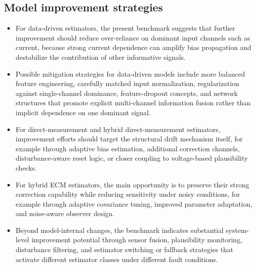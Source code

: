 \documentclass[review]{elsarticle}
\begin{document}
\subsection{Model improvement strategies}
\begin{itemize}[leftmargin=*]
    \item For data-driven estimators, the present benchmark suggests that further improvement should reduce over-reliance on dominant input channels such as current, because strong current dependence can amplify bias propagation and destabilize the contribution of other informative signals.
    \item Possible mitigation strategies for data-driven models include more balanced feature engineering, carefully matched input normalization, regularization against single-channel dominance, feature-dropout concepts, and network structures that promote explicit multi-channel information fusion rather than implicit dependence on one dominant signal.
    \item For direct-measurement and hybrid direct-measurement estimators, improvement efforts should target the structural drift mechanism itself, for example through adaptive bias estimation, additional correction channels, disturbance-aware reset logic, or closer coupling to voltage-based plausibility checks.
    \item For hybrid ECM estimators, the main opportunity is to preserve their strong correction capability while reducing sensitivity under noisy conditions, for example through adaptive covariance tuning, improved parameter adaptation, and noise-aware observer design.
    \item Beyond model-internal changes, the benchmark indicates substantial system-level improvement potential through sensor fusion, plausibility monitoring, disturbance filtering, and estimator switching or fallback strategies that activate different estimator classes under different fault conditions.
\end{itemize}
\end{document}
